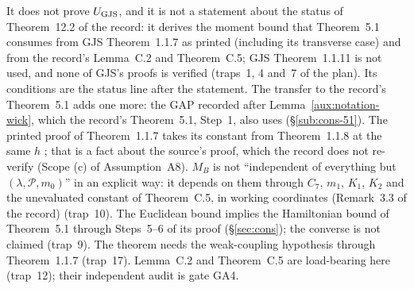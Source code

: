 \begin{auxrem}\label{aux:d4-not}
It does not prove $U_{\rm GJS}$, and it is not a statement about the status of Theorem~12.2 of the
record: it derives the moment bound that Theorem~5.1 consumes from GJS Theorem~1.1.7 as printed (including
its transverse case) and from the record's Lemma~C.2 and Theorem~C.5; GJS Theorem~1.1.11 is not
used, and none of GJS's proofs is verified (traps~1, 4 and~7 of the plan).  Its conditions are the
status line after the statement.  The transfer to the record's Theorem~5.1 adds one more: the GAP
recorded after Lemma~\ref{aux:notation-wick}, which the record's Theorem~5.1, Step~1, also uses
(\S\ref{sub:cons-51}).  The printed proof of Theorem~1.1.7 takes its constant from Theorem~1.1.8
at the same $h$ \cite[p.~597]{GJS}; that is a fact about the source's proof, which the record does
not re-verify (Scope (c) of Assumption~A8).  $M_B$ is not ``independent of everything but
$(\lambda,\mathscr P,m_0)$'' in an explicit way: it depends on them through $C_7$, $m_1$, $K_1$,
$K_2$ and the unevaluated constant of Theorem~C.5, in working coordinates (Remark~3.3 of the
record) (trap~10).  The Euclidean bound implies the Hamiltonian bound of Theorem~5.1 through
Steps~5--6 of its proof (\S\ref{sec:cons}); the converse is not claimed (trap~9).  The theorem
needs the weak-coupling hypothesis through Theorem~1.1.7 (trap~17).  Lemma~C.2 and Theorem~C.5 are
load-bearing here (trap~12); their independent audit is gate GA4.
\end{auxrem}
